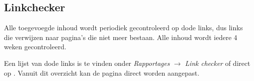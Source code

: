 \subsection{Linkchecker}
Alle toegevoegde inhoud wordt periodiek gecontroleerd op dode links, dus links die verwijzen naar pagina's die niet meer bestaan. Alle inhoud wordt iedere 4 weken gecontroleerd.

Een lijst van dode links is te vinden onder \emph{Rapportages} $\rightarrow$ \emph{Link checker} of direct op . Vanuit dit overzicht kan de pagina direct worden aangepast.